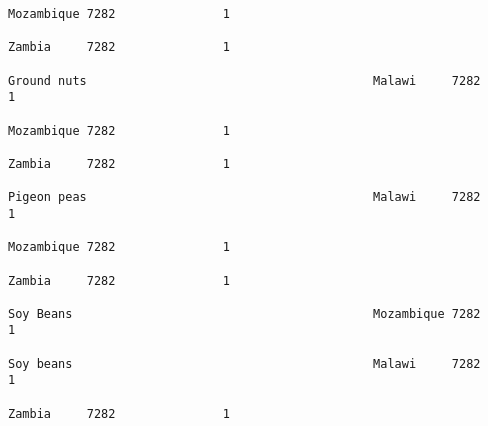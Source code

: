 \documentclass[11pt]{article}
\begin{document}
\begin{Verbatim}[commandchars=\\\{\}]
                                                                                                                                                                                                                 Mozambique 7282               1  
                                                                                                                                                                                                                 Zambia     7282               1  
                                                                                                                                                              Ground nuts                                        Malawi     7282               1  
                                                                                                                                                                                                                 Mozambique 7282               1  
                                                                                                                                                                                                                 Zambia     7282               1  
                                                                                                                                                              Pigeon peas                                        Malawi     7282               1  
                                                                                                                                                                                                                 Mozambique 7282               1  
                                                                                                                                                                                                                 Zambia     7282               1  
                                                                                                                                                              Soy Beans                                          Mozambique 7282               1  
                                                                                                                                                              Soy beans                                          Malawi     7282               1  
                                                                                                                                                                                                                 Zambia     7282               1  

\end{Verbatim}
\end{document}
